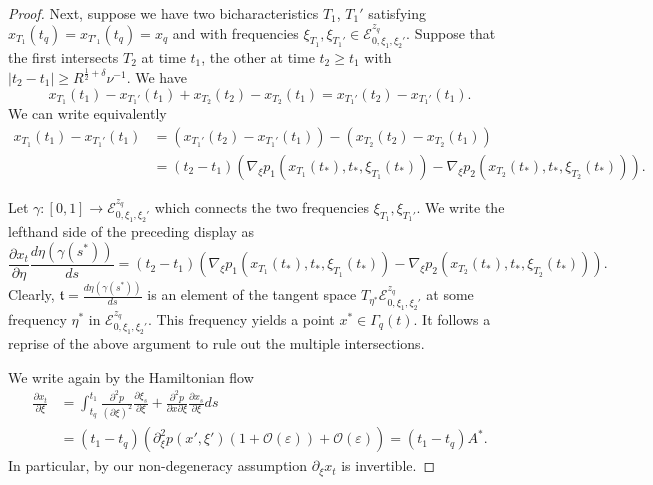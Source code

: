 \documentclass{amsart}
\theoremstyle{definition}
\begin{document}
\begin{proof}
\smallskip

Next, suppose we have two bicharacteristics $T_1$, $T_1'$ satisfying $x_{T_1}(t_q) = x_{T'_1}(t_q) = x_q$ and with frequencies $\xi_{T_1}, \xi_{T_1'} \in \mathcal{E}^{z_q}_{0,\xi_1,\xi_2'}$. Suppose that the first intersects $T_2$ at time $t_1$, the other at time $t_2 \geq t_1$ with $|t_2 - t_1| \geq R^{\frac{1}{2}+\delta} \nu^{-1}$. We have
\begin{equation*}
x_{T_1}(t_1) - x_{T_1'}(t_1) + x_{T_2}(t_2) - x_{T_2}(t_1) = x_{T_1'}(t_2) - x_{T_1'}(t_1).
\end{equation*}
We can write equivalently
\begin{equation*}
\begin{split}
x_{T_1}(t_1) - x_{T_1'}(t_1) &= (x_{T_1'}(t_2) - x_{T_1'}(t_1)) - (x_{T_2}(t_2) - x_{T_2}(t_1)) \\
&= (t_2 - t_1) (\nabla_{\xi} p_1(x_{T_1}(t_*),t_*, \xi_{T_1}(t_*)) - \nabla_{\xi} p_2(x_{T_2}(t_*),t_*,\xi_{T_2}(t_*))).
\end{split}
\end{equation*}

Let $\gamma:[0,1] \to \mathcal{E}^{z_q}_{0,\xi_1,\xi_2'}$ which connects the two frequencies $\xi_{T_1}, \xi_{T_1'}$. We write the lefthand side of the preceding display as
\begin{equation*}
\frac{\partial x_t}{\partial \eta} \frac{d \eta(\gamma(s^*))}{ds} = (t_2 - t_1) (\nabla_{\xi} p_1(x_{T_1}(t_*),t_*, \xi_{T_1}(t_*)) - \nabla_{\xi} p_2(x_{T_2}(t_*),t_*,\xi_{T_2}(t_*))).
\end{equation*}
Clearly, $\mathfrak{t} = \frac{d \eta(\gamma(s^*))}{ds}$ is an element of the tangent space $T_{\eta^*} \mathcal{E}^{z_q}_{0,\xi_1,\xi_2'}$ at some frequency $\eta^*$ in $\mathcal{E}^{z_q}_{0,\xi_1,\xi_2'}$. This frequency yields a point $x^* \in \Gamma_q(t)$. It follows a reprise of the above argument to rule out the multiple intersections.

We write again by the Hamiltonian flow
\begin{equation*}
\begin{split}
\frac{\partial x_t}{\partial \xi} &= \int_{t_q}^{t_1} \frac{\partial^2 p}{(\partial \xi)^2} \frac{\partial \xi_s}{\partial \xi} + \frac{\partial^2 p}{\partial x \partial \xi} \frac{\partial x_s}{\partial \xi} ds \\
&= (t_1-t_q) (\partial^2_{\xi} p(x',\xi') (1 + \mathcal{O}(\varepsilon)) + \mathcal{O}(\varepsilon )) = (t_1-t_q) A^*.
\end{split}
\end{equation*}
In particular, by our non-degeneracy assumption $\partial_{\xi} x_t$ is invertible.


\end{proof}
\end{document}
